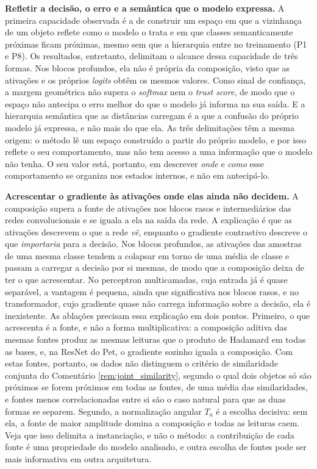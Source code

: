 \textbf{Refletir a decisão, o erro e a semântica que o modelo expressa.} A primeira capacidade observada é a de construir um espaço em que a vizinhança de um objeto reflete como o modelo o trata e em que classes semanticamente próximas ficam próximas, mesmo sem que a hierarquia entre no treinamento (P1 e P8). Os resultados, entretanto, delimitam o alcance dessa capacidade de três formas. Nos blocos profundos, ela não é própria da composição, visto que as ativações e os próprios \textit{logits} obtêm os mesmos valores. Como sinal de confiança, a margem geométrica não supera o \textit{softmax} nem o \textit{trust score}, de modo que o espaço não antecipa o erro melhor do que o modelo já informa na sua saída. E a hierarquia semântica que as distâncias carregam é a que a confusão do próprio modelo já expressa, e não mais do que ela. As três delimitações têm a mesma origem: o método lê um espaço construído a partir do próprio modelo, e por isso reflete o seu comportamento, mas não tem acesso a uma informação que o modelo não tenha. O seu valor está, portanto, em descrever \textit{onde} e \textit{como} esse comportamento se organiza nos estados internos, e não em antecipá-lo.

\textbf{Acrescentar o gradiente às ativações onde elas ainda não decidem.} A composição supera a fonte de ativações nos blocos rasos e intermediários das redes convolucionais e se iguala a ela na saída da rede. A explicação é que as ativações descrevem o que a rede \textit{vê}, enquanto o gradiente contrastivo descreve o que \textit{importaria} para a decisão. Nos blocos profundos, as ativações das amostras de uma mesma classe tendem a colapsar em torno de uma média de classe \citep{Papyan2020} e passam a carregar a decisão por si mesmas, de modo que a composição deixa de ter o que acrescentar. No perceptron multicamadas, cuja entrada já é quase separável, a vantagem é pequena, ainda que significativa nos blocos rasos, e no transformador, cujo gradiente quase não carrega informação sobre a decisão, ela é inexistente. As ablações precisam essa explicação em dois pontos. Primeiro, o que acrescenta é a fonte, e não a forma multiplicativa: a composição aditiva das mesmas fontes produz as mesmas leituras que o produto de Hadamard em todas as bases, e, na ResNet do Pet, o gradiente sozinho iguala a composição. Com estas fontes, portanto, os dados não distinguem o critério de similaridade conjunta do Comentário \ref{rem:joint_similarity}, segundo o qual dois objetos só são próximos se forem próximos em todas as fontes, de uma média das similaridades, e fontes menos correlacionadas entre si são o caso natural para que as duas formas se separem. Segundo, a normalização angular $T_a$ é a escolha decisiva: sem ela, a fonte de maior amplitude domina a composição e todas as leituras caem. Veja que isso delimita a instanciação, e não o método: a contribuição de cada fonte é uma propriedade do modelo analisado, e outra escolha de fontes pode ser mais informativa em outra arquitetura.

